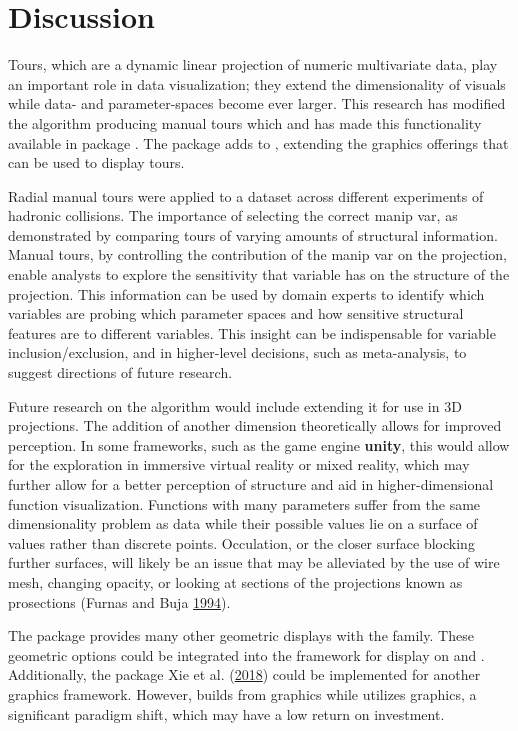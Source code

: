 \hypertarget{sec:discussion}{%
\section{Discussion}\label{sec:discussion}}

Tours, which are a dynamic linear projection of numeric multivariate
data, play an important role in data visualization; they extend the
dimensionality of visuals while data- and parameter-spaces become ever
larger. This research has modified the algorithm producing manual tours
which and has made this functionality available in package
. The package adds to , extending the graphics
offerings that can be used to display tours.

Radial manual tours were applied to a dataset across different
experiments of hadronic collisions. The importance of selecting the
correct manip var, as demonstrated by comparing tours of varying amounts
of structural information. Manual tours, by controlling the contribution
of the manip var on the projection, enable analysts to explore the
sensitivity that variable has on the structure of the projection. This
information can be used by domain experts to identify which variables
are probing which parameter spaces and how sensitive structural features
are to different variables. This insight can be indispensable for
variable inclusion/exclusion, and in higher-level decisions, such as
meta-analysis, to suggest directions of future research.

Future research on the algorithm would include extending it for use in
3D projections. The addition of another dimension theoretically allows
for improved perception. In some frameworks, such as the game engine
\textbf{unity}, this would allow for the exploration in immersive
virtual reality or mixed reality, which may further allow for a better
perception of structure and aid in higher-dimensional function
visualization. Functions with many parameters suffer from the same
dimensionality problem as data while their possible values lie on a
surface of values rather than discrete points. Occulation, or the closer
surface blocking further surfaces, will likely be an issue that may be
alleviated by the use of wire mesh, changing opacity, or looking at
sections of the projections known as prosections (Furnas and Buja
\protect\hyperlink{ref-furnas_prosection_1994}{1994}).

The  package provides many other geometric displays with the
 family. These geometric options could be
integrated into the  framework for display on 
and . Additionally, the  package Xie
et al. (\protect\hyperlink{ref-xie_animation:_2018}{2018}) could be
implemented for another graphics framework. However, 
builds from  graphics while  utilizes
 graphics, a significant paradigm shift, which may have a
low return on investment.

